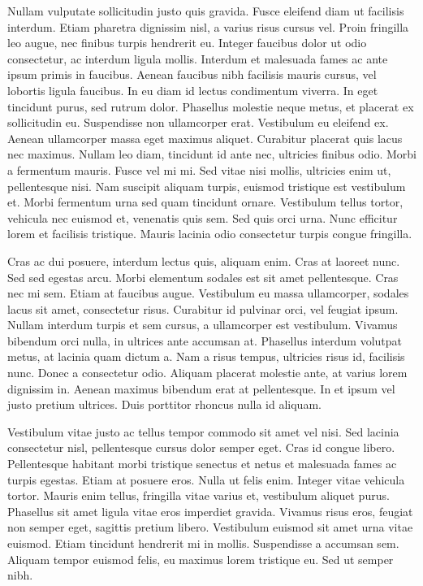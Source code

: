 \documentclass[10pt,letterpaper,sans]{moderncv}        %
\begin{document}
\vspace{10pt}

Nullam vulputate sollicitudin justo quis gravida. Fusce eleifend diam ut facilisis interdum. Etiam pharetra dignissim nisl, a varius risus cursus vel. Proin fringilla leo augue, nec finibus turpis hendrerit eu. Integer faucibus dolor ut odio consectetur, ac interdum ligula mollis. Interdum et malesuada fames ac ante ipsum primis in faucibus. Aenean faucibus nibh facilisis mauris cursus, vel lobortis ligula faucibus. In eu diam id lectus condimentum viverra. In eget tincidunt purus, sed rutrum dolor. Phasellus molestie neque metus, et placerat ex sollicitudin eu. Suspendisse non ullamcorper erat. Vestibulum eu eleifend ex. Aenean ullamcorper massa eget maximus aliquet. Curabitur placerat quis lacus nec maximus. Nullam leo diam, tincidunt id ante nec, ultricies finibus odio. Morbi a fermentum mauris. Fusce vel mi mi. Sed vitae nisi mollis, ultricies enim ut, pellentesque nisi. Nam suscipit aliquam turpis, euismod tristique est vestibulum et. Morbi fermentum urna sed quam tincidunt ornare. Vestibulum tellus tortor, vehicula nec euismod et, venenatis quis sem. Sed quis orci urna. Nunc efficitur lorem et facilisis tristique. Mauris lacinia odio consectetur turpis congue fringilla.

\vspace{10pt}

Cras ac dui posuere, interdum lectus quis, aliquam enim. Cras at laoreet nunc. Sed sed egestas arcu. Morbi elementum sodales est sit amet pellentesque. Cras nec mi sem. Etiam at faucibus augue. Vestibulum eu massa ullamcorper, sodales lacus sit amet, consectetur risus. Curabitur id pulvinar orci, vel feugiat ipsum. Nullam interdum turpis et sem cursus, a ullamcorper est vestibulum. Vivamus bibendum orci nulla, in ultrices ante accumsan at. Phasellus interdum volutpat metus, at lacinia quam dictum a. Nam a risus tempus, ultricies risus id, facilisis nunc. Donec a consectetur odio. Aliquam placerat molestie ante, at varius lorem dignissim in. Aenean maximus bibendum erat at pellentesque. In et ipsum vel justo pretium ultrices. Duis porttitor rhoncus nulla id aliquam.

\vspace{10pt}

Vestibulum vitae justo ac tellus tempor commodo sit amet vel nisi. Sed lacinia consectetur nisl, pellentesque cursus dolor semper eget. Cras id congue libero. Pellentesque habitant morbi tristique senectus et netus et malesuada fames ac turpis egestas. Etiam at posuere eros. Nulla ut felis enim. Integer vitae vehicula tortor. Mauris enim tellus, fringilla vitae varius et, vestibulum aliquet purus. Phasellus sit amet ligula vitae eros imperdiet gravida. Vivamus risus eros, feugiat non semper eget, sagittis pretium libero. Vestibulum euismod sit amet urna vitae euismod. Etiam tincidunt hendrerit mi in mollis. Suspendisse a accumsan sem. Aliquam tempor euismod felis, eu maximus lorem tristique eu. Sed ut semper nibh.

\vspace{10pt}

\makeletterclosing
\end{document}
